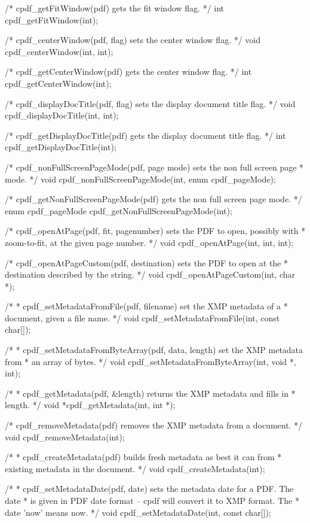/* cpdf_getFitWindow(pdf) gets the fit window flag. */
int cpdf_getFitWindow(int);

/* cpdf_centerWindow(pdf, flag) sets the center window flag. */
void cpdf_centerWindow(int, int);

/* cpdf_getCenterWindow(pdf) gets the center window flag. */
int cpdf_getCenterWindow(int);

/* cpdf_displayDocTitle(pdf, flag) sets the display document title flag. */
void cpdf_displayDocTitle(int, int);

/* cpdf_getDisplayDocTitle(pdf) gets the display document title flag. */
int cpdf_getDisplayDocTitle(int);

/* cpdf_nonFullScreenPageMode(pdf, page mode) sets the non full screen page
 * mode. */
void cpdf_nonFullScreenPageMode(int, enum cpdf_pageMode);

/* cpdf_getNonFullScreenPageMode(pdf) gets the non full screen page mode. */
enum cpdf_pageMode cpdf_getNonFullScreenPageMode(int);

/* cpdf_openAtPage(pdf, fit, pagenumber) sets the PDF to open, possibly with
 * zoom-to-fit, at the given page number. */
void cpdf_openAtPage(int, int, int);

/* cpdf_openAtPageCustom(pdf, destination) sets the PDF to open at the
 * destination described by the string. */
void cpdf_openAtPageCustom(int, char *);

/*
 * cpdf_setMetadataFromFile(pdf, filename) set the XMP metadata of a
 * document, given a file name.
 */
void cpdf_setMetadataFromFile(int, const char[]);

/*
 * cpdf_setMetadataFromByteArray(pdf, data, length) set the XMP metadata from
 * an array of bytes.
 */
void cpdf_setMetadataFromByteArray(int, void *, int);

/*
 * cpdf_getMetadata(pdf, &length) returns the XMP metadata and fills in
 * length.
 */
void *cpdf_getMetadata(int, int *);

/* cpdf_removeMetadata(pdf) removes the XMP metadata from a document. */
void cpdf_removeMetadata(int);

/*
 * cpdf_createMetadata(pdf) builds fresh metadata as best it can from
 * existing metadata in the document.
 */
void cpdf_createMetadata(int);

/*
 * cpdf_setMetadataDate(pdf, date) sets the metadata date for a PDF. The date
 * is given in PDF date format -- cpdf will convert it to XMP format. The
 * date 'now' means now.
 */
void cpdf_setMetadataDate(int, const char[]);

